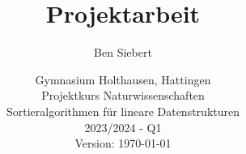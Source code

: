 \documentclass[./entry.tex]{subfiles}
\begin{document}
    \title{Projektarbeit}
    \author{Ben Siebert}
    \date{{
        Gymnasium Holthausen, Hattingen \\
        Projektkurs Naturwissenschaften \\
        Sortieralgorithmen für lineare Datenstrukturen \\
        2023/2024 - Q1 \\
        Version: \today
    }}
    \maketitle

    \thispagestyle{empty}
\end{document}
